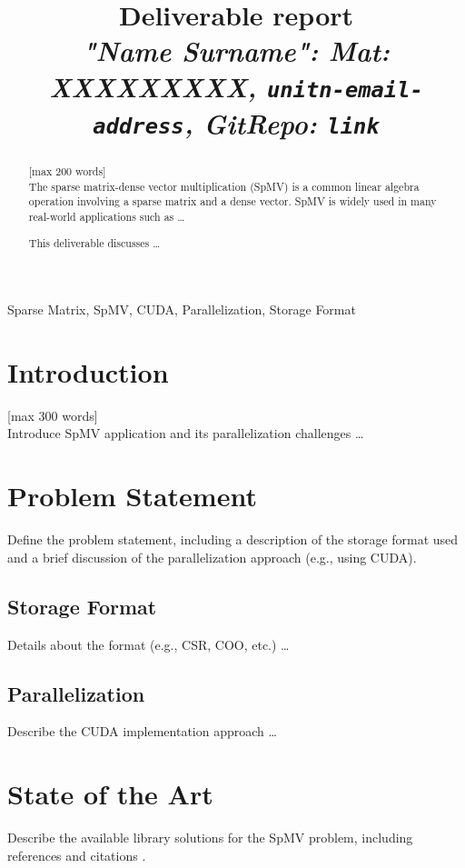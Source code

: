 \documentclass[conference]{IEEEtran}
\begin{document}
\title{Deliverable report \\
\footnotesize \textit{"Name Surname": Mat: XXXXXXXXX, \texttt{unitn-email-address}, GitRepo: \texttt{link}}}

\maketitle

\begin{abstract}
[max 200 words]\\
The sparse matrix-dense vector multiplication (SpMV) is a common linear algebra operation involving a sparse matrix and a dense vector. SpMV is widely used in many real-world applications such as \dots

This deliverable discusses \dots
\end{abstract}

\begin{IEEEkeywords}
Sparse Matrix, SpMV, CUDA, Parallelization, Storage Format
\end{IEEEkeywords}

\section{Introduction}
[max 300 words]\\
Introduce SpMV application and its parallelization challenges \dots

\section{Problem Statement}
Define the problem statement, including a description of the storage format used and a brief discussion of the parallelization approach (e.g., using CUDA).

\subsection{Storage Format}
Details about the format (e.g., CSR, COO, etc.) \dots

\subsection{Parallelization}
Describe the CUDA implementation approach \dots

\section{State of the Art}
Describe the available library solutions for the SpMV problem, including references and citations \cite{asimov1950irobot, svevo1923coscienza, pirandello1926uno}.
\end{document}
